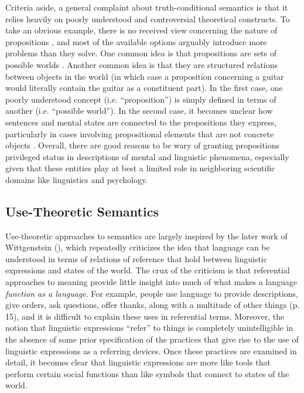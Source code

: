 Criteria aside, a general complaint about truth-conditional semantics is that it relies heavily on poorly understood and controversial theoretical constructs. To take an obvious example, there is no received view concerning the nature of propositions \citep{Speaks:2014,Soames:2010,Dennett:1987}, and most of the available options arguably introduce more problems than they solve. One common idea is that propositions are sets of possible worlds \citep{Speaks:2014}. Another common idea is that they are structured relations between objects in the world (in which case a proposition concerning a guitar would literally contain the guitar as a constituent part)\citep{Soames:2010}. In the first case, one poorly understood concept (i.e. ``proposition'') is simply defined in terms of another (i.e. ``possible world''). In the second case, it becomes unclear how sentences and mental states are connected to the propositions they express, particularly in cases involving propositional elements that are not concrete objects \citep{Speaks:2014}. Overall, there are good reasons to be wary of granting propositions privileged status in descriptions of mental and linguistic phenomena, especially given that these entities play at best a limited role in neighboring scientific domains like linguistics and psychology.
 
\subsection{Use-Theoretic Semantics}

Use-theoretic approaches to semantics are largely inspired by the later work of Wittgenstein (\citeyear{Wittgenstein:1953}), which repeatedly criticizes the idea that language can be understood in terms of relations of reference that hold between linguistic expressions and states of the world. The crux of the criticism is that referential approaches to meaning provide little insight into much of what makes a language \textit{function as a language}. For example, people use language to provide descriptions, give orders, ask questions, offer thanks, along with a multitude of other things (p. 15), and it is difficult to explain these uses in referential terms. Moreover, the notion that linguistic expressions ``refer'' to things is completely unintelligible in the absence of some prior specification of the practices that give rise to the use of linguistic expressions as a referring devices. Once these practices are examined in detail, it becomes clear that linguistic expressions are more like tools that perform certain social functions than like symbols that connect to states of the world. 

